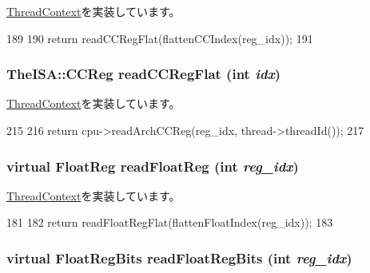 \hyperlink{classThreadContext_af924a3ae757b2a311dd16bc8acde1c27}{ThreadContext}を実装しています。


\begin{DoxyCode}
189                                          {
190         return readCCRegFlat(flattenCCIndex(reg_idx));
191     }
\end{DoxyCode}
\hypertarget{classO3ThreadContext_a576cfb60d7a873b30da62dc738e0e8ce}{
\subsubsection[{readCCRegFlat}]{\setlength{\rightskip}{0pt plus 5cm}TheISA::CCReg readCCRegFlat (int {\em idx})}}
\label{classO3ThreadContext_a576cfb60d7a873b30da62dc738e0e8ce}


\hyperlink{classThreadContext_aa6d1af2db95563430c5ce31b38838a93}{ThreadContext}を実装しています。


\begin{DoxyCode}
215 {
216     return cpu->readArchCCReg(reg_idx, thread->threadId());
217 }
\end{DoxyCode}
\hypertarget{classO3ThreadContext_ad85a5b48ebe475a9b1d1d3f31b51b942}{
\subsubsection[{readFloatReg}]{\setlength{\rightskip}{0pt plus 5cm}virtual {\bf FloatReg} readFloatReg (int {\em reg\_\-idx})}}
\label{classO3ThreadContext_ad85a5b48ebe475a9b1d1d3f31b51b942}


\hyperlink{classThreadContext_a7883083f396dee2160e4b8640d02f5f6}{ThreadContext}を実装しています。


\begin{DoxyCode}
181                                                {
182         return readFloatRegFlat(flattenFloatIndex(reg_idx));
183     }
\end{DoxyCode}
\hypertarget{classO3ThreadContext_a16de1015632e110ed029afa05ffd799d}{
\subsubsection[{readFloatRegBits}]{\setlength{\rightskip}{0pt plus 5cm}virtual {\bf FloatRegBits} readFloatRegBits (int {\em reg\_\-idx})}}
\label{classO3ThreadContext_a16de1015632e110ed029afa05ffd799d}


